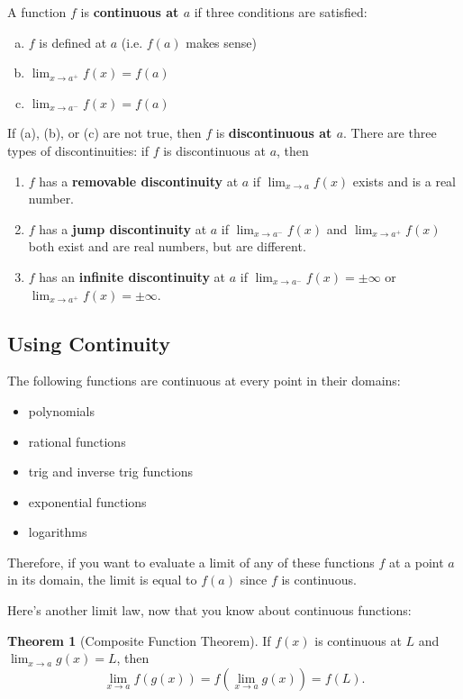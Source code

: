 \documentclass{article}
\theoremstyle{definition}
\newtheorem{theorem}{Theorem}[section]
\theoremstyle{definition}
\newenvironment{thm}[1][]{
\begin{tcolorbox}[colback=white!97!black, arc=0in]
\begin{theorem}[#1]
}{
\end{theorem}
\end{tcolorbox}
}
\begin{document}
A function $f$ is \textbf{continuous at $a$} if three conditions are satisfied:
\begin{enumerate}[(a)]
\item $f$ is defined at $a$ (i.e. $f(a)$ makes sense)
\item $\displaystyle\lim_{x\to a^+} f(x)= f(a)$
\item $\displaystyle\lim_{x\to a^-} f(x)= f(a)$
\end{enumerate}
If (a), (b), or (c) are not true, then $f$ is \textbf{discontinuous at $a$}. There are three types of discontinuities: if $f$ is discontinuous at $a$, then
\begin{enumerate}[1.]
\item $f$ has a \textbf{removable discontinuity} at $a$ if $\displaystyle\lim _{x \to a} f(x)$ exists and is a real number.
\item $f$ has a \textbf{jump discontinuity} at $a$ if $\displaystyle\lim _{x \to a^{-}} f(x)$ and $\displaystyle\lim _{x \to a^{+}} f(x)$ both exist and are real numbers, but are different.
\item $f$ has an \textbf{infinite discontinuity} at $a$ if $\displaystyle\lim _{x \to a^{-}} f(x)=\pm \infty$ or $\displaystyle\lim _{x \to a^{+}} f(x)=\pm \infty$.
\end{enumerate}

\subsection{Using Continuity}

The following functions are continuous at every point in their domains:
\begin{itemize}
\item polynomials
\item rational functions
\item trig and inverse trig functions
\item exponential functions
\item logarithms
\end{itemize}

Therefore, if you want to evaluate a limit of any of these functions $f$ at a point $a$ in its domain, the limit is equal to $f(a)$ since $f$ is continuous.

\vspace{1em}

\noindent Here's another limit law, now that you know about continuous functions:

\begin{thm}[Composite Function Theorem]
If $f(x)$ is continuous at $L$ and $\displaystyle\lim _{x \to a} g(x)=L$, then
$$\lim _{x \to a} f(g(x))=f\left(\lim _{x \to a} g(x)\right)=f(L).$$
\end{thm}
\end{document}
